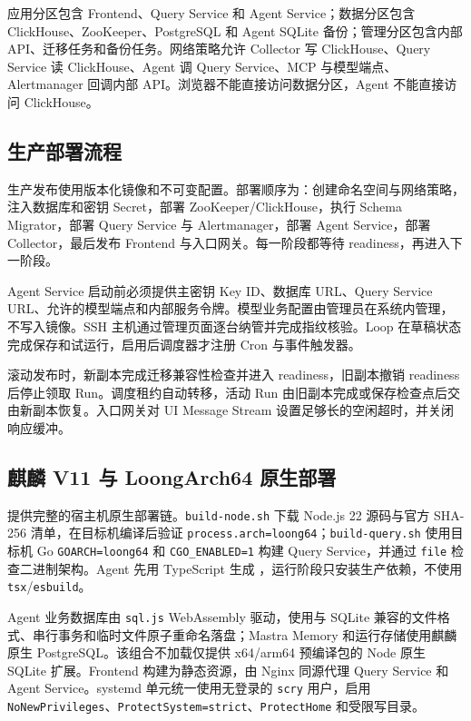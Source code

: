 \documentclass[conference,10pt]{IEEEtran}
\newcommand{\code}[1]{\texttt{#1}}
\newcommand{\filepath}[1]{\path{#1}}
\begin{document}
应用分区包含 Frontend、Query Service 和 Agent Service；数据分区包含 ClickHouse、ZooKeeper、PostgreSQL 和 Agent SQLite 备份；管理分区包含内部 API、迁移任务和备份任务。网络策略允许 Collector 写 ClickHouse、Query Service 读 ClickHouse、Agent 调 Query Service、MCP 与模型端点、Alertmanager 回调内部 API。浏览器不能直接访问数据分区，Agent 不能直接访问 ClickHouse。

\subsection{生产部署流程}

生产发布使用版本化镜像和不可变配置。部署顺序为：创建命名空间与网络策略，注入数据库和密钥 Secret，部署 ZooKeeper/ClickHouse，执行 Schema Migrator，部署 Query Service 与 Alertmanager，部署 Agent Service，部署 Collector，最后发布 Frontend 与入口网关。每一阶段都等待 readiness，再进入下一阶段。

Agent Service 启动前必须提供主密钥 Key ID、数据库 URL、Query Service URL、允许的模型端点和内部服务令牌。模型业务配置由管理员在系统内管理，不写入镜像。SSH 主机通过管理页面逐台纳管并完成指纹核验。Loop 在草稿状态完成保存和试运行，启用后调度器才注册 Cron 与事件触发器。

滚动发布时，新副本完成迁移兼容性检查并进入 readiness，旧副本撤销 readiness 后停止领取 Run。调度租约自动转移，活动 Run 由旧副本完成或保存检查点后交由新副本恢复。入口网关对 UI Message Stream 设置足够长的空闲超时，并关闭响应缓冲。

\subsection{麒麟 V11 与 LoongArch64 原生部署}

\filepath{deploy/kylin-loong64} 提供完整的宿主机原生部署链。\code{build-node.sh} 下载 Node.js 22 源码与官方 SHA-256 清单，在目标机编译后验证 \code{process.arch=loong64}；\code{build-query.sh} 使用目标机 Go \code{GOARCH=loong64} 和 \code{CGO\_ENABLED=1} 构建 Query Service，并通过 \code{file} 检查二进制架构。Agent 先用 TypeScript 生成 \filepath{dist}，运行阶段只安装生产依赖，不使用 \code{tsx}/\code{esbuild}。

Agent 业务数据库由 \code{sql.js} WebAssembly 驱动，使用与 SQLite 兼容的文件格式、串行事务和临时文件原子重命名落盘；Mastra Memory 和运行存储使用麒麟原生 PostgreSQL。该组合不加载仅提供 x64/arm64 预编译包的 Node 原生 SQLite 扩展。Frontend 构建为静态资源，由 Nginx 同源代理 Query Service 和 Agent Service。systemd 单元统一使用无登录的 \code{scry} 用户，启用 \code{NoNewPrivileges}、\code{ProtectSystem=strict}、\code{ProtectHome} 和受限写目录。
\end{document}
